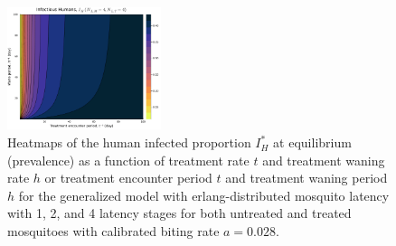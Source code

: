 \documentclass[11pt]{article}
\begin{document}
\begin{figure}[H]
  \includegraphics[width=0.4\textwidth]{../../fig/Ih_periods_txh_4x4_cal.pdf}
  \caption{Heatmaps of the human infected proportion $I_H^*$ at equilibrium (prevalence) as a function of treatment rate $t$ and treatment waning rate $h$ or treatment encounter period $t$ and treatment waning period $h$ for the generalized model with erlang-distributed mosquito latency with 1, 2, and 4 latency stages for both untreated and treated mosquitoes with calibrated biting rate $a=0.028$.}
\end{figure}
\end{document}
